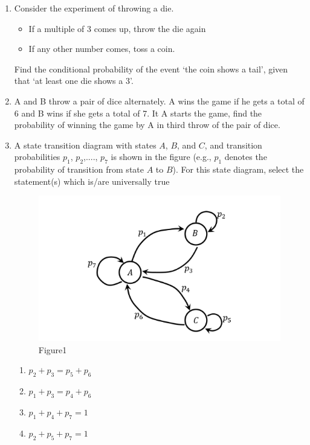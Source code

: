 \begin{enumerate}[label=\thechapter.\arabic*,ref=\thechapter.\theenumi]
	\item Consider the experiment of throwing a die.
    \begin{itemize}
        \item If a multiple of 3 comes up, throw the die again
        \item If any other number comes, toss a coin.
    \end{itemize}
     Find the conditional probability of the event \lq the coin shows a tail\rq, given that \lq at least one die shows a 3\rq.\\
		
  \item  A and B throw a pair of dice alternately. A wins the game if he gets a total of
6 and B wins if she gets a total of 7. It A starts the game, find the probability of
winning the game by A in third throw of the pair of dice.
\\

\item A state transition diagram with states $A$, $B$, and $C$, and transition probabilities $p_1$, $p_2$,...., $p_7$ is shown in the figure (e.g., $p_1$ denotes the probability of transition from state $A$ to $B$). For this state diagram, select the statement(s) which is/are universally true
\begin{figure}[ht!]
	\centering
	\includegraphics[width=\columnwidth]{gate/EC/2022/48/figs/fig.png}
    \caption{Figure1}
	\label{Fig:Figure1}
\end{figure}
\begin{enumerate}
\item $p_2 + p_3 = p_5 + p_6$\label{eq:28/2022/12}
\item $p_1 + p_3 = p_4 + p_6$
\item $p_1 + p_4 + p_7 = 1$\label{eq:28/2022/2}
\item $p_2 + p_5 +p_7 = 1$
\end{enumerate}

\end{enumerate}
